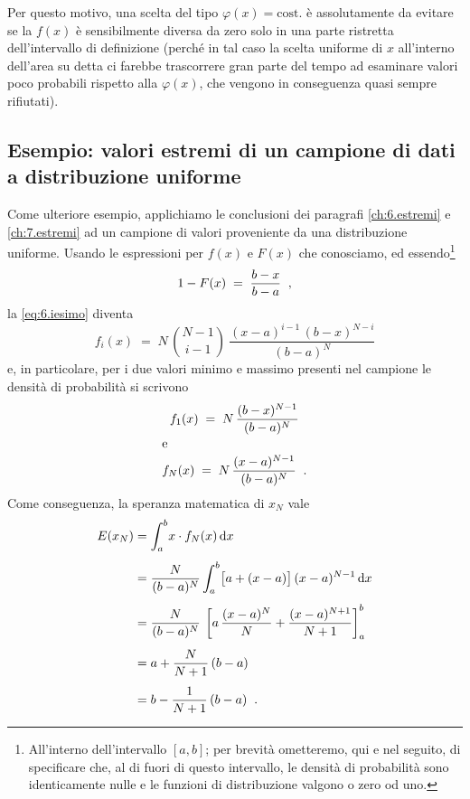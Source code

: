 Per questo motivo, una scelta del tipo
$\varphi(x)=\mathrm{cost.}$ \`e assolutamente da evitare se
la $f(x)$ \`e sensibilmente diversa da zero solo in una
parte ristretta dell'intervallo di definizione (perch\'e in
tal caso la scelta uniforme di $x$ all'interno dell'area su
detta ci farebbe trascorrere gran parte del tempo ad
esaminare valori poco probabili rispetto alla $\varphi(x)$,
che vengono in conseguenza quasi sempre rifiutati).%
%

\subsection{Esempio: valori estremi di un campione di dati a
  distribuzione uniforme}
%
\label{ch:8.estremi}
Come ulteriore esempio, applichiamo le conclusioni dei
paragrafi \ref{ch:6.estremi} e \ref{ch:7.estremi} ad un
campione di valori proveniente da una distribuzione
uniforme.  Usando le espressioni per $f(x)$ e $F(x)$ che
conosciamo, ed essendo\/\footnote{All'interno
  dell'intervallo $[a,b]$; per brevit\`a ometteremo, qui e
  nel seguito, di specificare che, al di fuori di questo
  intervallo, le densit\`a di probabilit\`a sono
  identicamente nulle e le funzioni di distribuzione valgono
  o zero od uno.}
\begin{equation*}
  1 - F(x) \; = \; \frac{b - x}{b - a} \;\; ,
\end{equation*}
la \eqref{eq:6.iesimo} diventa
\begin{equation*}
  f_i(x) \; = \; N \, \binom{N - 1}{i - 1} \: \frac{(x -
    a)^{i - 1} \, (b - x)^{N - i}}{(b - a)^N}
\end{equation*}
e, in particolare, per i due valori minimo e massimo
presenti nel campione le densit\`a di probabilit\`a si
scrivono
\begin{gather*}
  f_1(x) \; = \; N \, \frac{(b - x)^{N - 1}}{(b - a)^N} \\
  \intertext{e}
  f_N(x) \; = \; N \, \frac{(x - a)^{N - 1}}{(b - a)^N} \;\;
  .
\end{gather*}
Come conseguenza, la speranza matematica di $x_N$ vale
\begin{align*}
  E ( x_N ) &= \int_a^b \! x \cdot f_N(x) \, \mathrm{d} x \\[1ex]
  &= \frac{N}{(b - a)^N} \int_a^b \bigl[ a + (x - a)
  \bigr] \, (x - a)^{N - 1} \, \mathrm{d} x \\[1ex]
  &= \frac{N}{(b - a)^N}\:  \left[ a \, \frac{(x - a)^N}{N}
    + \frac{(x - a)^{N + 1}}{N + 1} \right]_a^b \\[1ex]
  &= a + \frac{N}{N + 1} \, (b - a) \\[1ex]
  &= b - \frac{1}{N + 1} \, (b - a) \;\; .
\end{align*}
